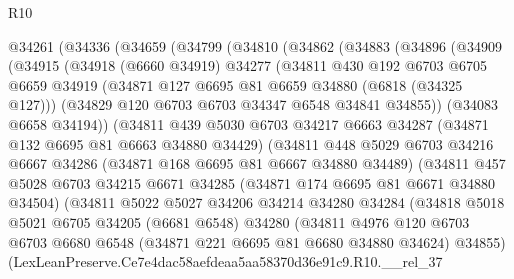 \begin{lexlean}{R10}
\begin{coremodule}
  @34261
    (@34336
      (@34659
        (@34799
          (@34810
            (@34862
              (@34883
                (@34896
                  (@34909
                    (@34915
                      (@34918
                        (@6660 @34919)
                        @34277
                        (@34811
                          @430
                          @192
                          @6703
                          @6705
                          @6659
                          @34919
                          (@34871 @127 @6695 @81 @6659 @34880 (@6818 (@34325 @127)))
                          (@34829 @120 @6703 @6703 @34347 @6548 @34841 @34855))
                        (@34083 @6658 @34194))
                      (@34811
                        @439
                        @5030
                        @6703
                        @34217
                        @6663
                        @34287
                        (@34871 @132 @6695 @81 @6663 @34880 @34429)
                        (@34811
                          @448
                          @5029
                          @6703
                          @34216
                          @6667
                          @34286
                          (@34871 @168 @6695 @81 @6667 @34880 @34489)
                          (@34811
                            @457
                            @5028
                            @6703
                            @34215
                            @6671
                            @34285
                            (@34871 @174 @6695 @81 @6671 @34880 @34504)
                            (@34811
                              @5022
                              @5027
                              @34206
                              @34214
                              @34280
                              @34284
                              (@34818
                                @5018
                                @5021
                                @6705
                                @34205
                                (@6681 @6548)
                                @34280
                                (@34811
                                  @4976
                                  @120
                                  @6703
                                  @6703
                                  @6680
                                  @6548
                                  (@34871 @221 @6695 @81 @6680 @34880 @34624)
                                  @34855)
                                (LexLeanPreserve.Ce7e4dac58aefdeaa5aa58370d36e91c9.R10.__rel_37

\end{coremodule}
\end{lexlean}
